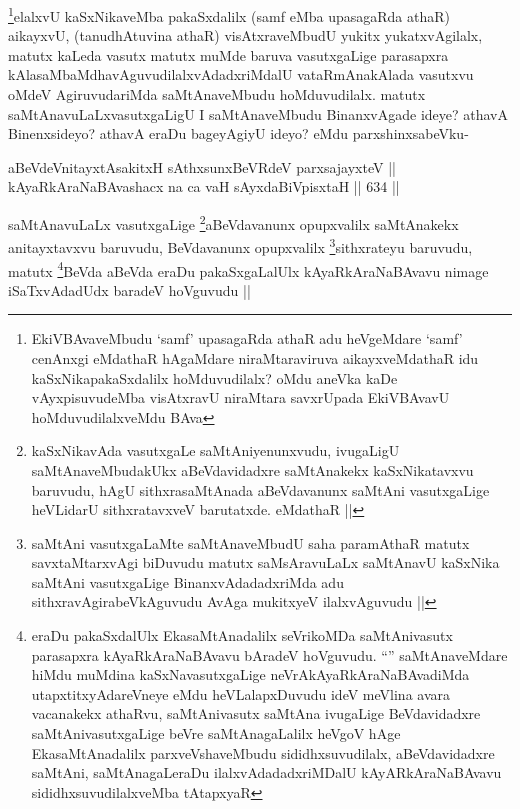 \begin{artha}
\footnote{EkiVBAvaveMbudu `samf' upasagaRda athaR adu heVgeMdare `samf' cenAnxgi eMdathaR hAgaMdare niraMtaraviruva aikayxveMdathaR idu kaSxNikapakaSxdalilx hoMduvudilalx? oMdu aneVka kaDe vAyxpisuvudeMba visAtxravU niraMtara savxrUpada EkiVBAvavU hoMduvudilalxveMdu BAva}elalxvU kaSxNikaveMba pakaSxdalilx (samf eMba upasagaRda athaR) aikayxvU, (tanudhAtuvina athaR) visAtxraveMbudU yukitx yukatxvAgilalx, matutx kaLeda vasutx matutx muMde baruva vasutxgaLige parasapxra kAlasaMbaMdhavAguvudilalxvAdadxriMdalU vataRmAnakAlada vasutxvu oMdeV AgiruvudariMda saMtAnaveMbudu hoMduvudilalx. matutx saMtAnavuLaLxvasutxgaLigU I saMtAnaveMbudu BinanxvAgade ideye? athavA Binenxsideyo? athavA eraDu bageyAgiyU ideyo? eMdu parxshinxsabeVku-
\end{artha}


\begin{shl}
aBeVdeV\s nitayxtAsakitxH sAthxsunxBeVRdeV parxsajayxteV ||  \\
kAyaRkAraNaBAvashacx na ca vaH sAyxdaBiVpisxtaH ||  634 ||  
\end{shl}

\begin{artha}
saMtAnavuLaLx vasutxgaLige \footnote{kaSxNikavAda vasutxgaLe saMtAniyenunxvudu, ivugaLigU saMtAnaveMbudakUkx aBeVdavidadxre saMtAnakekx kaSxNikatavxvu baruvudu, hAgU sithxrasaMtAnada aBeVdavanunx saMtAni vasutxgaLige heVLidarU sithxratavxveV barutatxde. eMdathaR ||}aBeVdavanunx opupxvalilx saMtAnakekx anitayxtavxvu baruvudu, BeVdavanunx opupxvalilx \footnote{saMtAni vasutxgaLaMte saMtAnaveMbudU saha paramAthaR matutx savxtaMtarxvAgi biDuvudu matutx saMsAravuLaLx saMtAnavU kaSxNika saMtAni vasutxgaLige BinanxvAdadadxriMda adu sithxravAgirabeVkAguvudu AvAga mukitxyeV ilalxvAguvudu ||}sithxrateyu baruvudu, matutx \footnote{eraDu pakaSxdalUlx EkasaMtAnadalilx seVrikoMDa saMtAnivasutx parasapxra kAyaRkAraNaBAvavu bAradeV hoVguvudu. ``\stext'' saMtAnaveMdare hiMdu muMdina kaSxNavasutxgaLige neVrAkAyaRkAraNaBAvadiMda utapxtitxyAdareVneye eMdu heVLalapxDuvudu ideV meVlina avara vacanakekx athaRvu, saMtAnivasutx saMtAna ivugaLige BeVdavidadxre saMtAnivasutxgaLige beVre saMtAnagaLalilx heVgoV hAge EkasaMtAnadalilx parxveVshaveMbudu sididhxsuvudilalx, aBeVdavidadxre saMtAni, saMtAnagaLeraDu ilalxvAdadadxriMDalU kAyARkAraNaBAvavu sididhxsuvudilalxveMba tAtapxyaR}BeVda aBeVda eraDu pakaSxgaLalUlx kAyaRkAraNaBAvavu nimage iSaTxvAdadUdx baradeV hoVguvudu ||
\end{artha}

